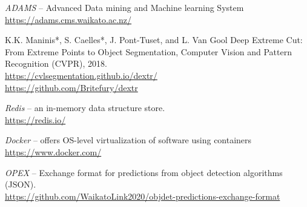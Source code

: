 
\begin{thebibliography}{999}

		\textit{ADAMS} -- Advanced Data mining and Machine learning System \\
		\url{https://adams.cms.waikato.ac.nz/}{}

		K.K. Maninis*, S. Caelles*, J. Pont-Tuset, and L. Van Gool
        Deep Extreme Cut: From Extreme Points to Object Segmentation,
        Computer Vision and Pattern Recognition (CVPR), 2018. \\
		\url{https://cvlsegmentation.github.io/dextr/}{} \\
		\url{https://github.com/Britefury/dextr}{}

		\textit{Redis} -- an in-memory data structure store. \\
		\url{https://redis.io/}{}

		\textit{Docker} -- offers OS-level virtualization of software using containers \\
		\url{https://www.docker.com/}{}

		\textit{OPEX} -- Exchange format for predictions from object detection algorithms (JSON). \\
		\url{https://github.com/WaikatoLink2020/objdet-predictions-exchange-format}{}

\end{thebibliography}
